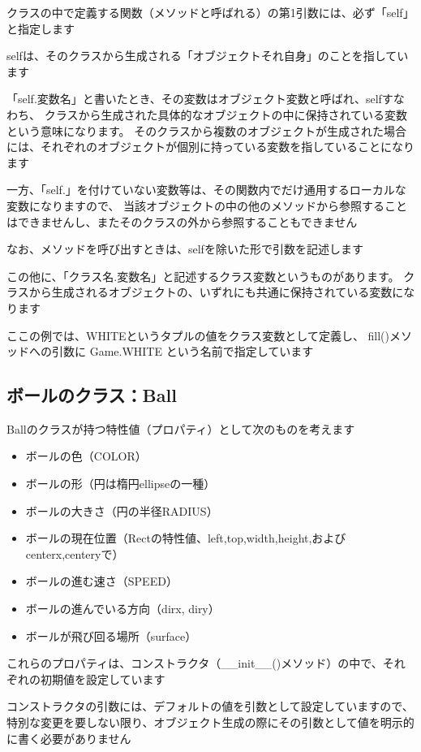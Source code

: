 \documentclass[uplatex,a4paper,11pt,oneside,openany]{jsbook}
\begin{document}
クラスの中で定義する関数（メソッドと呼ばれる）の第1引数には、必ず「self」と指定します

selfは、そのクラスから生成される「オブジェクトそれ自身」のことを指しています

「self.変数名」と書いたとき、その変数はオブジェクト変数と呼ばれ、selfすなわち、
クラスから生成された具体的なオブジェクトの中に保持されている変数という意味になります。
そのクラスから複数のオブジェクトが生成された場合には、それぞれのオブジェクトが個別に持っている変数を指していることになります

一方、「self.」を付けていない変数等は、その関数内でだけ通用するローカルな変数になりますので、
当該オブジェクトの中の他のメソッドから参照することはできませんし、またそのクラスの外から参照することもできません

なお、メソッドを呼び出すときは、selfを除いた形で引数を記述します

この他に、「クラス名.変数名」と記述するクラス変数というものがあります。
クラスから生成されるオブジェクトの、いずれにも共通に保持されている変数になります

ここの例では、WHITEというタプルの値をクラス変数として定義し、
fill()メソッドへの引数に Game.WHITE という名前で指定しています

\subsection{ボールのクラス：Ball}

Ballのクラスが持つ特性値（プロパティ）として次のものを考えます

\begin{itemize}
  \item ボールの色（COLOR）
  \item ボールの形（円は楕円ellipseの一種）
  \item ボールの大きさ（円の半径RADIUS）
  \item ボールの現在位置（Rectの特性値、left,top,width,height,およびcenterx,centeryで）
  \item ボールの進む速さ（SPEED）
  \item ボールの進んでいる方向（dirx, diry）
  \item ボールが飛び回る場所（surface）
\end{itemize}

これらのプロパティは、コンストラクタ（\_\_init\_\_()メソッド）の中で、それぞれの初期値を設定しています

コンストラクタの引数には、デフォルトの値を引数として設定していますので、
特別な変更を要しない限り、オブジェクト生成の際にその引数として値を明示的に書く必要がありません
\end{document}
